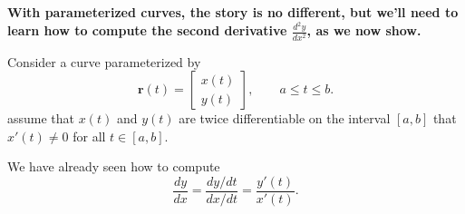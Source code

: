 \documentclass[10pt]{article}
\theoremstyle{definition}
\newcommand{\vt}{\vskip 5mm} %
\newcommand{\Fl}{\vt\noindent\textbf} %
\newcommand{\1}[1]{\textbf{1}_{\left[#1\right]}} %
\begin{document}
\Fl{With parameterized curves, the story is no different, but we'll need to learn how to compute the second derivative
  $\frac{d^{2}y}{dx^{2}}$, as we now show.}

Consider a curve parameterized by
\begin{equation*}
  \mathbf{r}(t) =
  \begin{bmatrix}
    x(t)\\y(t)
  \end{bmatrix},
  \qquad a \leq t \leq b.
\end{equation*}
assume that $x(t)$ and $y(t)$ are twice differentiable on the interval $[a,b]$
that  $x'(t)\neq 0$ for all $t\in [a,b]$.

We have already seen how to compute
\begin{equation*}
  \frac{dy}{dx} = \frac{dy/dt}{dx/dt} = \frac{y'(t)}{x'(t)}.
\end{equation*}
\end{document}
